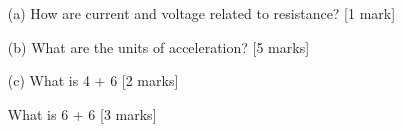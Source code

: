 \begin{itemize}

\item[(a)]  How are current and voltage related to resistance? [1 mark]

\item[(b)]  What are the units of acceleration? [5 marks]

\item[(c)]  What is 4 + 6 [2 marks]

What is 6 + 6 [3 marks]

\end{itemize}
